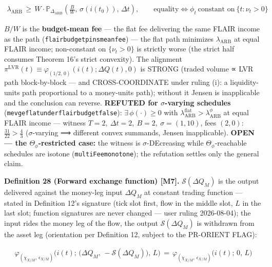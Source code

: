 \documentclass[11pt]{article}
\renewcommand{\_}{\textunderscore\allowbreak}
\begin{document}
\[
    \begin{aligned}
        \lambda_{\text{ARB}} \, \geq \, W\cdot \mathbb{P}_{\Delta_{\text{ARB}}}\!\left(\frac{B}{W},\,\sigma(i(t_0)),\,\Delta t\right),
        \qquad \text{equality} \iff \phi_t\ \text{constant on}\ \{t : \nu_t > 0\}
    \end{aligned}
\]

\(B/W\) is the \textbf{budget-mean fee} --- the flat fee delivering the same FLAIR income as the path (\texttt{flair\_budget\_pins\_mean\_fee}) --- the flat path minimizes \(\lambda_{\text{ARB}}\) at equal FLAIR income; non-constant on \(\{\nu_t > 0\}\) is strictly worse (the strict half consumes Theorem 16's strict convexity). The alignment \(\pi^{\mathrm{LVR}}(t) \equiv \varphi_{(1/2,\,0)}(i(t); \Delta Q(t), 0)\) is STRONG (traded volume ∝ LVR path block-by-block --- and CROSS-COORDINATE under ruling (i): a liquidity-units path proportional to a money-units path); without it Jensen is inapplicable and the conclusion can reverse. \textbf{REFUTED for \(\sigma\)-varying schedules} (\texttt{mev\_ge\_flat\_under\_flair\_budget\_false}): \(\exists\, \phi(\cdot) \geq 0\) with \(\lambda_{\text{ARB}}^{\text{flat}} > \lambda_{\text{ARB}}^{\phi}\) at equal FLAIR income --- witness \(T{=}2,\ \Delta t{=}2,\ B{=}2,\ \sigma=(1,10)\), fees \((2,0)\): \(\tfrac{31}{22} > \tfrac{4}{3}\) (\(\sigma\)-varying ⟹ different convex summands, Jensen inapplicable). \textbf{OPEN --- the \(\Theta_{\phi}\)-restricted case:} the witness is \(\sigma\)-DEcreasing while \(\Theta_{\phi}\)-reachable schedules are isotone (\texttt{multiFee\_monotone}); the refutation settles only the general claim.

\textbf{Definition 28 (Forward exchange function) {[}M7{]}.} \(\mathcal{S}(\Delta Q_M)\) is the output delivered against the money-leg input \(\Delta Q_M\) at constant trading function --- stated in Definition 12's signature (tick slot first, flow in the middle slot, \(L\) in the last slot; function signatures are never changed --- user ruling 2026-08-04); the input rides the money leg of the flow, the output \(\mathcal{S}(\Delta Q_M)\) is withdrawn from the asset leg (orientation per Definition 12, subject to the PR-ORIENT FLAG):

\[
    \begin{aligned}
        \varphi_{(\chi_{X/M},\,\epsilon_{X/M})}\Big(i(t);\, \big(\Delta Q_M,\, -\mathcal{S}(\Delta Q_M)\big),\, L\Big) \, = \, \varphi_{(\chi_{X/M},\,\epsilon_{X/M})}\big(i(t);\, 0,\, L\big)
    \end{aligned}
\]
\end{document}
